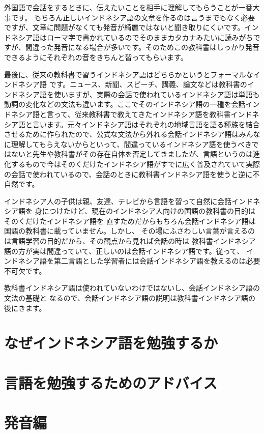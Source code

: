 \documentclass[uplatex]{jsarticle}
\theoremstyle{definition}
\begin{document}
外国語で会話をするときに、伝えたいことを相手に理解してもらうことが一番大事です。
もちろん正しいインドネシア語の文章を作るのは言うまでもなく必要ですが、文章に問題がなくても発音が綺麗ではないと聞き取りにくいです。インドネシア語はローマ字で書かれているのでそのままカタカナみたいに読みがちですが、間違った発音になる場合が多いです。そのためこの教科書はしっかり発音できるようにそれぞれの音をきちんと習ってもらいます。

最後に、従来の教科書で習うインドネシア語はどちらかというとフォーマルなインドネシア語
です。ニュース、新聞、スピーチ、講義、論文などは教科書のインドネシア語を使いますが、実際の会話で使われているインドネシア語は単語も動詞の変化などの文法も違います。ここでそのインドネシア語の一種を会話インドネシア語と言って、従来教科書で教えてきたインドネシア語を教科書インドネシア語と言います。元々インドネシア語はそれぞれの地域言語を語る種族を結合させるために作られたので、公式な文法から外れる会話インドネシア語はみんなに理解してもらえないからといって、間違っているインドネシア語を使うべきではないと先生や教科書がその存在自体を否定してきましたが、言語というのは進化するもので今はそのくだけたインドネシア語がすでに広く普及されていて実際の会話で使われているので、会話のときに教科書インドネシア語を使うと逆に不自然です。

インドネシア人の子供は親、友達、テレビから言語を習って自然に会話インドネシア語を
身につけたけど、現在のインドネシア人向けの国語の教科書の目的はそのくだけたインドネシア語を
直すためだからもちろん会話インドネシア語は国語の教科書に載っていません。しかし、
その場にふさわしい言葉が言えるのは言語学習の目的だから、その観点から見れば会話の時は
教科書インドネシア語の方が実は間違っていて、正しいのは会話インドネシア語です。従って、
インドネシア語を第二言語とした学習者には会話インドネシア語を教えるのは必要不可欠です。

教科書インドネシア語は使われていないわけではないし、会話インドネシア語の文法の基礎と
なるので、会話インドネシア語の説明は教科書インドネシア語の後にきます。

\section{なぜインドネシア語を勉強するか}

\section{言語を勉強するためのアドバイス}

\section{発音編}
\end{document}
